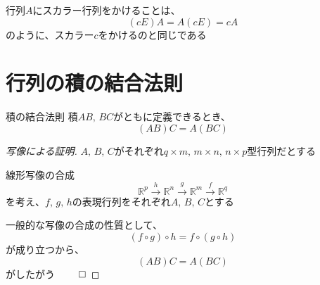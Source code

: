 \documentclass[../../../topic_linear-map]{subfiles}
\begin{document}
行列$A$にスカラー行列をかけることは、
\begin{equation*}
  (cE)A = A(cE) = cA
\end{equation*}
のように、スカラー$c$をかけるのと同じである

\sectionline
\section{行列の積の結合法則}

\begin{theorem}{積の結合法則}
  積$AB, \, BC$がともに定義できるとき、
  \begin{equation*}
    (AB)C = A(BC)
  \end{equation*}
\end{theorem}

\begin{proof}[写像による証明]
  $A,\,B, \, C$がそれぞれ$q \times m, \, m \times n, \, n \times p$型行列だとする

  線形写像の合成
  \begin{equation*}
    \mathbb{R}^p \xrightarrow{h} \mathbb{R}^n \xrightarrow{g} \mathbb{R}^m \xrightarrow{f} \mathbb{R}^q
  \end{equation*}
  を考え、$f,\, g, \, h$の表現行列をそれぞれ$A, \, B, \, C$とする

  一般的な写像の合成の性質として、
  \begin{equation*}
    (f \circ g) \circ h = f \circ (g \circ h)
  \end{equation*}
  が成り立つから、
  \begin{equation*}
    (AB)C = A(BC)
  \end{equation*}
  がしたがう $\qed$
\end{proof}
\end{document}
